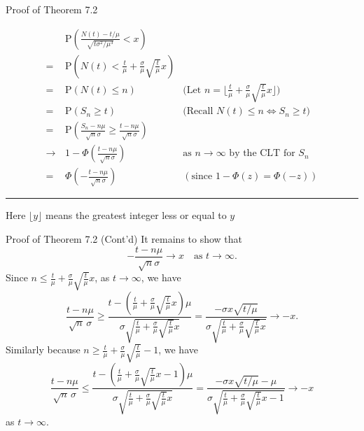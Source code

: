 \documentclass[letterpaper,handout]{beamer}
\def\p{\mathrm P}
\begin{document}
\begin{frame}{Proof of Theorem 7.2}

\vspace{-10pt}
\begin{align*}
&\p\left(\frac{N(t)-t/\mu}{\sqrt{t\sigma^2/\mu^3}}<x\right)\\
=\,&\p\left(N(t)<\frac{t}{\mu}+\frac{\sigma}{\mu}\sqrt{\frac{t}{\mu}}x\right)\\
=\,&\p(N(t)\le n)&\Big(\mbox{Let }n=\Big\lfloor\frac{t}{\mu}+\frac{\sigma}{\mu}\sqrt{\frac{t}{\mu}}x\Big\rfloor\Big)\\
=\,&\p(S_n\ge t)&\mbox{(Recall } N(t)\le n \Leftrightarrow S_n\ge t)\\
=\,&\p\left(\frac{S_n-n\mu}{\sqrt{n}\sigma}\ge \frac{t-n\mu}{\sqrt{n}\sigma}\right)\\
\longrightarrow\,&1-\Phi\left(\frac{t-n\mu}{\sqrt{n}\sigma}\right)&\mbox{as }n\to\infty\mbox{ by the CLT for }S_n\\
=\,&\Phi\left(-\frac{t-n\mu}{\sqrt{n}\sigma}\right)&(\mbox{since }1-\Phi(z)=\Phi(-z))
\end{align*}
\hrule\medskip
\footnotesize{\quad Here $\lfloor y\rfloor$ means the greatest integer less or equal to $y$}
\end{frame}
\begin{frame}{Proof of Theorem 7.2 (Cont'd)}
It remains to show that
$$-\frac{t-n\mu}{\sqrt{n}\sigma}\longrightarrow x\quad\mbox{as }t\to\infty.
$$
Since $n\le \frac{t}{\mu}+\frac{\sigma}{\mu}\sqrt{\frac{t}{\mu}}x$, as $t\to\infty$, we have
$$\frac{t-n\mu}{\sqrt{n}\,\sigma}\ge \frac{t-(\frac{t}{\mu}+\frac{\sigma}{\mu}\sqrt{\frac{t}{\mu}}x)\mu}{\sigma\sqrt{\frac{t}{\mu}+\frac{\sigma}{\mu}\sqrt{\frac{t}{\mu}}x}}
=\frac{-\sigma x\sqrt{t/\mu}}{\sigma\sqrt{\frac{t}{\mu}+\frac{\sigma}{\mu}\sqrt{\frac{t}{\mu}}x}}\longrightarrow -x.$$
Similarly because $n\ge \frac{t}{\mu}+\frac{\sigma}{\mu}\sqrt{\frac{t}{\mu}}-1$, we have
$$\frac{t-n\mu}{\sqrt{n}\,\sigma}\le \frac{t-(\frac{t}{\mu}+\frac{\sigma}{\mu}\sqrt{\frac{t}{\mu}}x-1)\mu}{\sigma\sqrt{\frac{t}{\mu}+\frac{\sigma}{\mu}\sqrt{\frac{t}{\mu}}x}}
=\frac{-\sigma x\sqrt{t/\mu}-\mu}{\sigma\sqrt{\frac{t}{\mu}+\frac{\sigma}{\mu}\sqrt{\frac{t}{\mu}}x-1}}\longrightarrow -x$$
as $t\to\infty$.
\end{frame}
\end{document}

